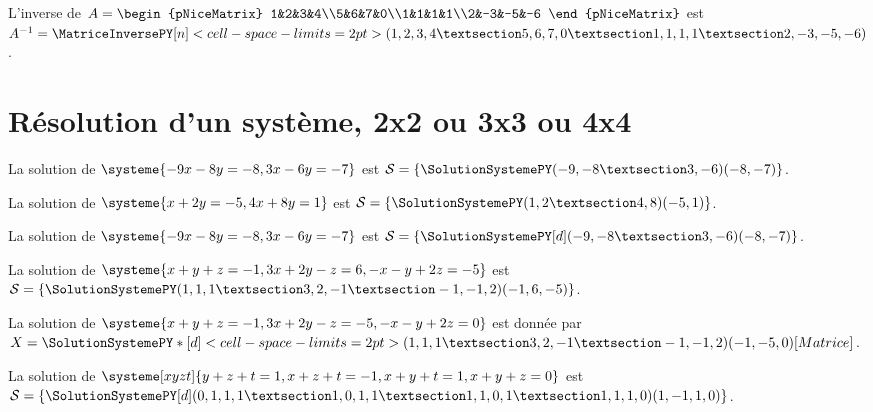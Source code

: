 \documentclass[french,a4paper,10pt]{article}
\begin{document}
\begin{ShowCodeTeX}
L'inverse de $A=\begin{pNiceMatrix} 1&2&3&4\\5&6&7&0\\1&1&1&1\\2&-3&-5&-6 \end{pNiceMatrix}$
est $A^{-1}=\MatriceInversePY[n]<cell-space-limits=2pt>(1,2,3,4 § 5,6,7,0 § 1,1,1,1 § 2,-3,-5,-6)$.
\end{ShowCodeTeX}

\section{Résolution d'un système, 2x2 ou 3x3 ou 4x4}

\begin{ShowCodeTeX}
La solution de $\systeme{-9x-8y=-8,3x-6y=-7}$ est $\mathcal{S}=%
\left\lbrace \SolutionSystemePY(-9,-8 § 3,-6)(-8,-7) \right\rbrace$.
\end{ShowCodeTeX}

\begin{ShowCodeTeX}
La solution de $\systeme{x+2y=-5,4x+8y=1}$ est $\mathcal{S}=%
\left\lbrace \SolutionSystemePY(1,2 § 4,8)(-5,1) \right\rbrace$.
\end{ShowCodeTeX}

\begin{ShowCodeTeX}
La solution de $\systeme{-9x-8y=-8,3x-6y=-7}$ est $\mathcal{S}=%
\left\lbrace \SolutionSystemePY[d](-9,-8 § 3,-6)(-8,-7) \right\rbrace$.
\end{ShowCodeTeX}

\begin{ShowCodeTeX}
La solution de $\systeme{x+y+z=-1,3x+2y-z=6,-x-y+2z=-5}$ est $\mathcal{S}=%
\left\lbrace \SolutionSystemePY(1,1,1 § 3,2,-1 § -1,-1,2)(-1,6,-5) \right\rbrace$.
\end{ShowCodeTeX}

\begin{ShowCodeTeX}
La solution de $\systeme{x+y+z=-1,3x+2y-z=-5,-x-y+2z=0}$ est donnée par $X=%
\SolutionSystemePY*[d]<cell-space-limits=2pt>(1,1,1 § 3,2,-1 § -1,-1,2)(-1,-5,0)[Matrice]$.
\end{ShowCodeTeX}

\begin{ShowCodeTeX}
La solution de $\systeme[xyzt]{y+z+t=1,x+z+t=-1,x+y+t=1,x+y+z=0}$ est $\mathcal{S}=%
\left\lbrace\SolutionSystemePY[d](0,1,1,1 § 1,0,1,1 § 1,1,0,1 § 1,1,1,0)(1,-1,1,0)\right\rbrace$.
\end{ShowCodeTeX}
\end{document}
